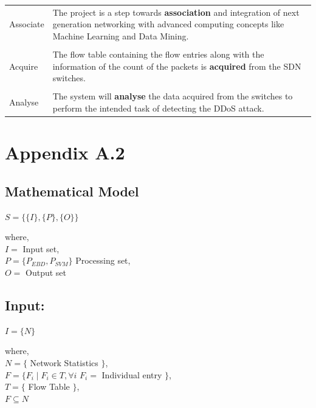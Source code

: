 \documentclass[12pt,a4paper,final]{report}
\DeclareRobustCommand{\gobblefive}[5]{}
\newcommand*{\SkipTocEntry}{\addtocontents{toc}{\gobblefive}}
\begin{document}
\vspace*{1cm}
\begin{center}
\begin{tabular}{|m{2cm}|m{7cm}|}
\hline

Associate & The project is a step towards \textbf{association} and integration of next generation networking with advanced computing concepts like Machine Learning and Data Mining. \\

&\\

Acquire & The flow table containing the flow entries along with the information of the count of the packets is \textbf{acquired} from the SDN switches. \\

&\\

Analyse & The system will \textbf{analyse} the data acquired from the switches to perform the intended task of detecting the DDoS attack. \\

\hline
\end{tabular}
\end{center}

\newpage
\SkipTocEntry\section{Appendix A.2}
\SkipTocEntry\subsection{Mathematical Model}
$S = \lbrace \lbrace I \rbrace ,\lbrace P \rbrace,\lbrace O \rbrace \rbrace $

\noindent
where,\\
$I =$ Input set,\\
$P = \lbrace P_{EBD}, P_{SVM} \rbrace$ Processing set, \\
$O =$ Output set

\SkipTocEntry\subsection{Input:}

$I = \lbrace N \rbrace$

\noindent
where,\\
$N = \lbrace $ Network Statistics $ \rbrace $, \\
$F =\lbrace F_{i} \mid F_{i} \in T , \forall i$ $ F_{i} =$ Individual entry $ \rbrace$, \\
$T = \lbrace $ Flow Table $ \rbrace$, \\
$F \subseteq N$
\end{document}
